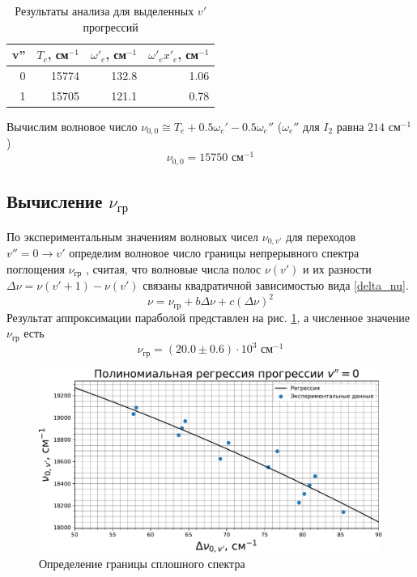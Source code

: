 \begin{table}[htbp]
	\centering
	\caption{Результаты анализа для выделенных $v'$ прогрессий}
	\begin{tabular}{|r|r|r|r|}
		\hline
		\multicolumn{1}{|l|}{v''} & \multicolumn{1}{l|}{$T_e$, см$^{-1}$} & \multicolumn{1}{l|}{$\omega'_e$, см$^{-1}$} & \multicolumn{1}{l|}{$\omega'_e x'_e$, см$^{-1}$} \bigstrut\\
		\hline
		0 & 15774 & 132.8 & 1.06 \bigstrut\\
		\hline
		1 & 15705 & 121.1 & 0.78 \bigstrut\\
		\hline
	\end{tabular}%
	\label{tab:parabola}%
\end{table}%

Вычислим волновое число $\nu_{0,0} \cong T_e + 0.5\omega_e' - 0.5\omega_e''$ ($\omega_e''$ для $I_2$ равна $214$ см$^{-1}$)
\begin{equation}
\nu_{0,0} = 15750 \text{ см$^{-1}$}
\end{equation}


\subsection{Вычисление $\nu_{\text{гр}}$}
По экспериментальным значениям волновых чисел $\nu_{0,v'}$ для переходов $v''= 0 \to v'$ определим волновое число границы непрерывного спектра поглощения $\nu_{\text{гр}}$ , считая, что волновые числа полос $\nu(v')$ и их разности $\Delta \nu =\nu(v'+1)-\nu(v')$ связаны квадратичной зависимостью
вида \eqref{delta_nu}.
\begin{equation}
\nu = \nu_{\text{гр}} +b\Delta\nu+c\left(\Delta \nu\right)^2
\label{delta_nu}
\end{equation}
Результат аппроксимации параболой представлен на рис. \ref{fig:delta_nu}, а численное значение $\nu_{\text{гр}}$ есть
\begin{equation}
\nu_{\text{гр}} = (20.0 \pm 0.6) \cdot 10^3 \text{ см$^{-1}$}
\end{equation}
\begin{figure}[h!]
	\centering
	\includegraphics[height=0.35\textheight]{data/delta_nu}
	\caption{Определение границы сплошного спектра}
	\label{fig:delta_nu}
\end{figure}

